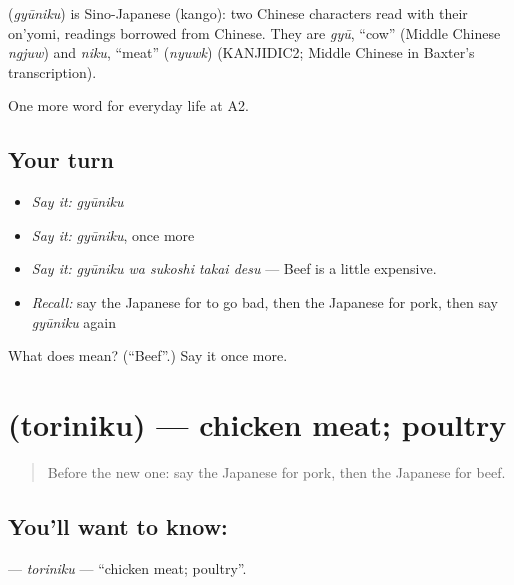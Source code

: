 \begin{cousinweb}
\textbf{} (\emph{gyūniku}) is Sino-Japanese (kango): two Chinese characters read with their on'yomi, readings borrowed from Chinese. They are \emph{gyū}, \textquotedblleft{}cow\textquotedblright{} (Middle Chinese \emph{ngjuw}) and \emph{niku}, \textquotedblleft{}meat\textquotedblright{} (\emph{nyuwk}) (KANJIDIC2; Middle Chinese in Baxter's transcription).
\end{cousinweb}

\begin{grammarlens}[title={What you've built}]
One more word for everyday life at A2.
\end{grammarlens}

\subsection*{Your turn}
\begin{itemize}
\raggedright
  \item \emph{Say it:} \emph{gyūniku}
  \item \emph{Say it:} \emph{gyūniku}, once more
  \item \emph{Say it:} \emph{gyūniku wa sukoshi takai desu} — Beef is a little expensive.
  \item \emph{Recall:} say the Japanese for to go bad, then the Japanese for pork, then say \emph{gyūniku} again
\end{itemize}

\begin{tcolorbox}[breakable,colback=teal!4,colframe=teal!35!black,title={Before you move on}]
What does  mean? (\textquotedblleft{}Beef\textquotedblright{}.) Say it once more.
\end{tcolorbox}
\section[\texorpdfstring{\ja{とりにく} (toriniku)}{とりにく (toriniku)}]{ (toriniku) — chicken meat; poultry}

\label{lesson:JA-C178-toriniku}



\begin{quote}
Before the new one: say the Japanese for pork, then the Japanese for beef.
\end{quote}

\subsection*{You'll want to know: }
\textbf{} — \emph{toriniku} — \textquotedblleft{}chicken meat; poultry\textquotedblright{}.

